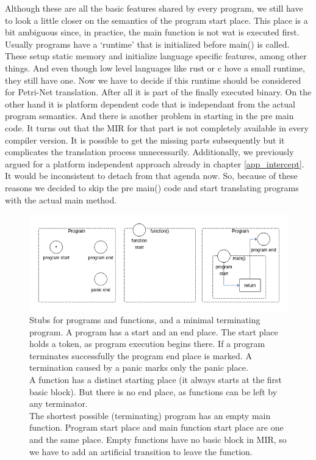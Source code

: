 Although these are all the basic features shared by every program, we still have to look a little closer on the semantics of the program start place.
This place is a bit ambiguous since, in practice, the main function is not wat is executed first.
Usually programs have a `runtime' that is initialized before main() is called.
These setup static memory and initialize language specific features, among other things.
And even though low level languages like rust or c hove a small runtime, they still have one.
Now we have to decide if this runtime should be considered for Petri-Net translation.
After all it is part of the finally executed binary.
On the other hand it is platform dependent code that is independant from the actual program semantics.
And there is another problem in starting in the pre main code.
It turns out that the MIR for that part is not completely available in every compiler version.
It is possible to get the missing parts subsequently but it complicates the translation process unnecessarily.
Additionally, we previously argued for a platform independent approach already in chapter \ref{app_intercept}.
It would be inconsistent to detach from that agenda now.
So, because of these reasons we decided to skip the pre main() code and start translating programs with the actual main method.

\begin{figure}
    \centering
    \includegraphics[width=.9\textwidth]{../diagrams/basic_program.png}
    \caption{
        Stubs for programs and functions, and a minimal terminating program.
        A program has a start and an end place.
        The start place holds a token, as program execution begins there.
        If a program terminates successfully the program end place is marked.
        A termination caused by a panic marks only the panic place.\\
        A function has a distinct starting place (it always starts at the first basic block).
        But there is no end place, as functions can be left by any terminator.\\
        The shortest possible (terminating) program has an empty main function.
        Program start place and main function start place are one and the same place.
        Empty functions have no basic block in MIR, so we have to add an artificial transition to leave the function.
    }
    \label{program_blocks_trans}
\end{figure}

